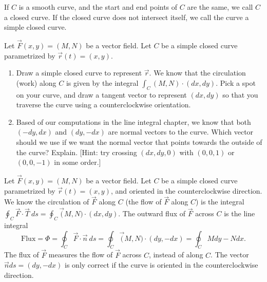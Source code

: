 \begin{definition}
 If $C$ is a smooth curve, and the start and end points of $C$ are the same, we call $C$ a closed curve.  If the closed curve does not intersect itself, we call the curve a simple closed curve.
\end{definition}


\begin{problem}
 Let $\vec F(x,y)=(M,N)$ be a vector field.  Let $C$ be a simple closed curve parametrized by $\vec r(t)=(x,y)$. 
\begin{enumerate}
 \item Draw a simple closed curve to represent $\vec r$.  We know that the circulation (work) along $C$ is given by the integral $\int_C (M,N)\cdot (dx,dy)$.  Pick a spot on your curve, and draw a tangent vector  to represent $(dx,dy)$ so that you traverse the curve using a counterclockwise orientation.
 \item Based of our computations in the line integral chapter, we know that both $(-dy,dx)$ and $(dy,-dx)$ are normal vectors to the curve.  Which vector should we use if we want the normal vector that points towards the outside of the curve? Explain. [Hint: try crossing $(dx,dy,0)$ with $(0,0,1)$ or $(0,0,-1)$ in some order.]
\end{enumerate}
\end{problem}

\begin{definition}[Flux]
%
 Let $\vec F(x,y)=(M,N)$ be a vector field.  Let $C$ be a simple closed curve parametrized by $\vec r(t)=(x,y)$, and oriented in the counterclockwise direction. 
 We know the circulation of $\vec F$ along $C$ (the flow of $\vec F$ along $C$) is the integral $\oint_C \vec F\cdot \vec T\ ds = \oint_C\vec (M,N)\cdot(dx,dy)$. The outward flux of $\vec F$ across $C$ is the line integral
$$\text{Flux}=\Phi = \oint_C \vec F\cdot \vec n\ ds = \oint_C\vec (M,N)\cdot(dy,-dx) = \oint_C Mdy-Ndx.$$
The flux of $\vec F$ measures the flow of $\vec F$ across $C$, instead of along $C$.
The vector $\vec n ds = (dy,-dx)$ is only correct if the curve is oriented in the counterclockwise direction.
\end{definition}




